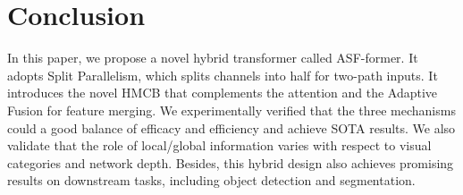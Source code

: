 \documentclass[lettersize,journal]{IEEEtran}
\begin{document}
\section{Conclusion}
In this paper, we propose a novel hybrid transformer called ASF-former. It adopts Split Parallelism, which splits channels into half for two-path inputs. It introduces the novel HMCB that complements the attention and the Adaptive Fusion for feature merging. We experimentally verified that the three mechanisms could a good balance of efficacy and efficiency and achieve SOTA results. We also validate that the role of local/global information varies with respect to visual categories and network depth. Besides, this hybrid design also achieves promising results on downstream tasks, including object detection and segmentation.

\normalem


\end{document}
